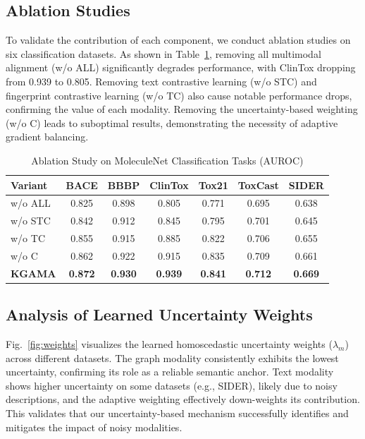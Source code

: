 \documentclass[journal]{IEEEtran}
\begin{document}
\subsection{Ablation Studies}
To validate the contribution of each component, we conduct ablation studies on six classification datasets. As shown in Table~\ref{tab:ablation}, removing all multimodal alignment (w/o ALL) significantly degrades performance, with ClinTox dropping from 0.939 to 0.805. Removing text contrastive learning (w/o STC) and fingerprint contrastive learning (w/o TC) also cause notable performance drops, confirming the value of each modality. Removing the uncertainty-based weighting (w/o C) leads to suboptimal results, demonstrating the necessity of adaptive gradient balancing.

\FloatBarrier
\begin{table}[htbp]
\caption{Ablation Study on MoleculeNet Classification Tasks (AUROC)}
\label{tab:ablation}
\centering
\begin{tabular}{@{}lcccccc@{}}
\toprule
\textbf{Variant} & \textbf{BACE} & \textbf{BBBP} & \textbf{ClinTox} & \textbf{Tox21} & \textbf{ToxCast} & \textbf{SIDER} \\
\midrule
w/o ALL & 0.825 & 0.898 & 0.805 & 0.771 & 0.695 & 0.638 \\
w/o STC & 0.842 & 0.912 & 0.845 & 0.795 & 0.701 & 0.645 \\
w/o TC & 0.855 & 0.915 & 0.885 & 0.822 & 0.706 & 0.655 \\
w/o C & 0.862 & 0.922 & 0.915 & 0.835 & 0.709 & 0.661 \\
\midrule
\textbf{KGAMA} & \textbf{0.872} & \textbf{0.930} & \textbf{0.939} & \textbf{0.841} & \textbf{0.712} & \textbf{0.669} \\
\bottomrule
\end{tabular}
\end{table}
\FloatBarrier

\subsection{Analysis of Learned Uncertainty Weights}
Fig.~\ref{fig:weights} visualizes the learned homoscedastic uncertainty weights ($\lambda_m$) across different datasets. The graph modality consistently exhibits the lowest uncertainty, confirming its role as a reliable semantic anchor. Text modality shows higher uncertainty on some datasets (e.g., SIDER), likely due to noisy descriptions, and the adaptive weighting effectively down-weights its contribution. This validates that our uncertainty-based mechanism successfully identifies and mitigates the impact of noisy modalities.
\end{document}
